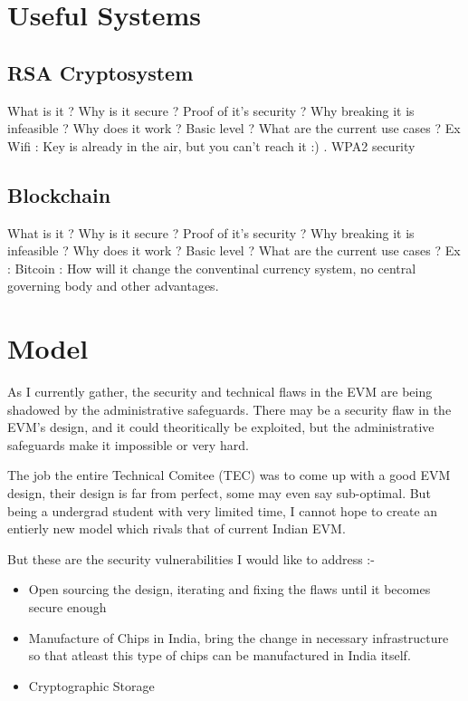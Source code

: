 \documentclass[12pt]{report}
\begin{document}

\chapter{Useful Systems}
\section{RSA Cryptosystem}
What is it ? Why is it secure ? Proof of it's security ? Why breaking it is infeasible ? Why does it work ? Basic level ? What are the current use cases ?
Ex Wifi : Key is already in the air, but you can't reach it :) . WPA2 security 

\section{Blockchain}
What is it ? Why is it secure ? Proof of it's security ? Why breaking it is infeasible ? Why does it work ? Basic level ? What are the current use cases ?
Ex : Bitcoin : How will it change the conventinal currency system, no central governing body and other advantages.


\chapter{Model}
As I currently gather, the security and technical flaws in the EVM are being shadowed by the administrative safeguards. There may be a security flaw in the EVM's design, and it could theoritically be exploited, but the administrative safeguards make it impossible or very hard.

The job the entire Technical Comitee (TEC) was to come up with a good EVM design, their design is far from perfect, some may even say sub-optimal. 
But being a undergrad student with very limited time, I cannot hope to create an entierly new model which rivals that of current Indian EVM.

\label{sec:addr}
But these are the security vulnerabilities I would like to address :- 
\begin{itemize}
  \item Open sourcing the design, iterating and fixing the flaws until it becomes secure enough
  \item Manufacture of Chips in India, bring the change in necessary infrastructure so that atleast this type of chips can be manufactured in India itself.
  \item Cryptographic Storage
\end{itemize}
\end{document}

